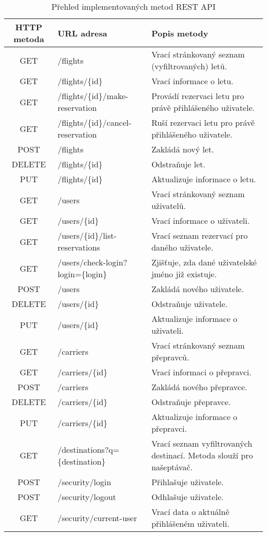 \documentclass[ing,male,java,dept460]{diploma}						%
\begin{document}
\begin{table}
	\centering
	\begin{tabular}{|c|l|p{6cm}|}
		\hline
		HTTP metoda & URL adresa & Popis metody \\
		\hline
		GET & /flights & Vrací stránkovaný seznam (vyfiltrovaných) letů. \\
		\hline
		GET & /flights/\{id\} & Vrací informace o letu. \\
		\hline
		GET & /flights/\{id\}/make-reservation & Provádí rezervaci letu pro právě přihlášeného uživatele. \\
		\hline
		GET & /flights/\{id\}/cancel-reservation & Ruší rezervaci letu pro právě přihlášeného uživatele. \\
		\hline
		POST & /flights & Zakládá nový let. \\
		\hline
		DELETE & /flights/\{id\} & Odstraňuje let. \\
		\hline
		PUT & /flights/\{id\} & Aktualizuje informace o letu. \\


		\hline
		GET & /users & Vrací stránkovaný seznam uživatelů. \\
		\hline
		GET & /users/\{id\} & Vrací informace o uživateli. \\
		\hline
		GET & /users/\{id\}/list-reservations & Vrací seznam rezervací pro daného uživatele. \\
		\hline
		GET & /users/check-login?login=\{login\} & Zjišťuje, zda dané uživatelské jméno již existuje. \\
		\hline
		POST & /users & Zakládá nového uživatele. \\
		\hline
		DELETE & /users/\{id\} & Odstraňuje uživatele. \\
		\hline
		PUT & /users/\{id\} & Aktualizuje informace o uživateli. \\

		\hline
		GET & /carriers & Vrací stránkovaný seznam přepravců. \\
		\hline
		GET & /carriers/\{id\} & Vrací informaci o přepravci. \\
		\hline
		POST & /carriers & Zakládá nového přepravce. \\
		\hline
		DELETE & /carriers/\{id\} & Odstraňuje přepravce. \\
		\hline
		PUT & /carriers/\{id\} & Aktualizuje informace o přepravci. \\

		\hline
		GET & /destinations?q=\{destination\} & Vrací seznam vyfiltrovaných destinací. Metoda slouží pro našeptávač. \\

		\hline
		POST & /security/login & Přihlašuje uživatele. \\
		\hline
		POST & /security/logout & Odhlašuje uživatele. \\
		\hline
		GET & /security/current-user & Vrací data o aktuálně přihlášeném uživateli. \\
		\hline
	\end{tabular}
	\caption{Přehled implementovaných metod REST API}
	\label{tab:RestAPI}
\end{table}
\end{document}
